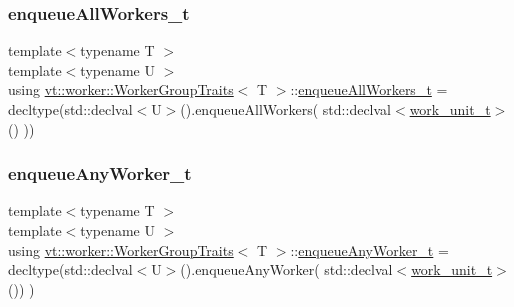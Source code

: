 \mbox{\label{structvt_1_1worker_1_1_worker_group_traits_a408b704c65e78ddd4f90963eb4e48cf0}} 
\subsubsection{\texorpdfstring{enqueue\+All\+Workers\+\_\+t}{enqueueAllWorkers\_t}}
{\footnotesize\ttfamily template$<$typename T $>$ \\
template$<$typename U $>$ \\
using \hyperlink{structvt_1_1worker_1_1_worker_group_traits}{vt\+::worker\+::\+Worker\+Group\+Traits}$<$ T $>$\+::\hyperlink{structvt_1_1worker_1_1_worker_group_traits_a408b704c65e78ddd4f90963eb4e48cf0}{enqueue\+All\+Workers\+\_\+t} =  decltype(std\+::declval$<$U$>$().enqueue\+All\+Workers( std\+::declval$<$\hyperlink{structvt_1_1worker_1_1_worker_group_traits_ae7c108d04180f59f3e2cd4fa065be4b0}{work\+\_\+unit\+\_\+t}$>$() ))}

\mbox{\label{structvt_1_1worker_1_1_worker_group_traits_a2eaad9ce43633046cc98b466dc1088ac}} 
\subsubsection{\texorpdfstring{enqueue\+Any\+Worker\+\_\+t}{enqueueAnyWorker\_t}}
{\footnotesize\ttfamily template$<$typename T $>$ \\
template$<$typename U $>$ \\
using \hyperlink{structvt_1_1worker_1_1_worker_group_traits}{vt\+::worker\+::\+Worker\+Group\+Traits}$<$ T $>$\+::\hyperlink{structvt_1_1worker_1_1_worker_group_traits_a2eaad9ce43633046cc98b466dc1088ac}{enqueue\+Any\+Worker\+\_\+t} =  decltype(std\+::declval$<$U$>$().enqueue\+Any\+Worker( std\+::declval$<$\hyperlink{structvt_1_1worker_1_1_worker_group_traits_ae7c108d04180f59f3e2cd4fa065be4b0}{work\+\_\+unit\+\_\+t}$>$()) )}


